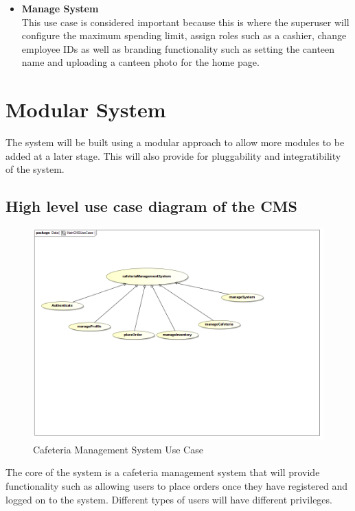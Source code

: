 \documentclass[a4paper,12pt]{article}
\begin{document}
\begin{itemize}
\item \textbf{ Manage System} \\
This use case is considered important because this is where the superuser will configure the maximum spending limit, assign roles such as a cashier, change employee IDs as well as branding functionality such as setting the canteen name and uploading a canteen photo for the home page.

\end{itemize}

\section{Modular System}

The system will be built using a modular approach to allow more modules to be added at a later stage. This will also provide for pluggability and integratibility of the system.

\subsection{High level use case diagram of the CMS}
\begin{figure}[H]
  \centering
    \includegraphics[width=1.0\textwidth]{../images/CMSUseCase.png}
    \caption{Cafeteria Management System Use Case} 
\end{figure}

The core of the system is a cafeteria management system that will provide functionality such as allowing users to place orders once they have registered and logged on to the system. Different types of users will have different privileges. 
\end{document}
